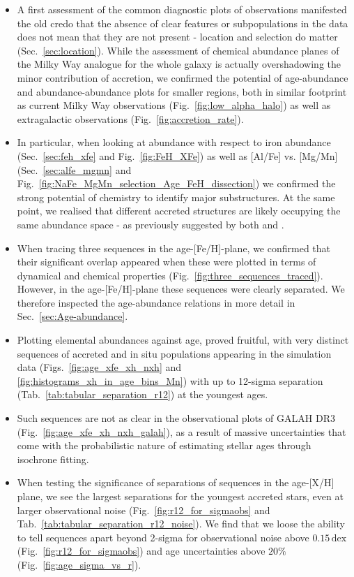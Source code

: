 \documentclass[fleqn,usenatbib]{mnras}
\begin{document}
\begin{itemize}
    \item A first assessment of the common diagnostic plots of observations manifested the old credo that the absence of clear features or subpopulations in the data does not mean that they are not present - location and selection do matter (Sec.~\ref{sec:location}). While the assessment of chemical abundance planes of the Milky Way analogue for the whole galaxy is actually overshadowing the minor contribution of accretion, we confirmed the potential of age-abundance and abundance-abundance plots for smaller regions, both in similar footprint as current Milky Way observations (Fig.~\ref{fig:low_alpha_halo}) as well as extragalactic observations (Fig.~\ref{fig:accretion_rate}).
    \item In particular, when looking at abundance with respect to iron abundance (Sec.~\ref{sec:feh_xfe} and Fig.~\ref{fig:FeH_XFe}) as well as [Al/Fe] vs. [Mg/Mn] (Sec.~\ref{sec:alfe_mgmn} and Fig.~\ref{fig:NaFe_MgMn_selection_Age_FeH_dissection}) we confirmed the strong potential of chemistry to identify major substructures. At the same point, we realised that different accreted structures are likely occupying the same abundance space - as previously suggested by both \citet{Horta2021} and \citet{Rey2023}.
    \item When tracing three sequences in the age-[Fe/H]-plane, we confirmed that their significant overlap appeared when these were plotted in terms of dynamical and chemical properties (Fig.~\ref{fig:three_sequences_traced}). However, in the age-[Fe/H]-plane these sequences were clearly separated. We therefore inspected the age-abundance relations in more detail in Sec.~\ref{sec:Age-abundance}. 
    \item Plotting elemental abundances against age, proved fruitful, with very distinct sequences of accreted and in situ populations appearing in the simulation data (Figs.~\ref{fig:age_xfe_xh_nxh} and \ref{fig:histograms_xh_in_age_bins_Mn}) with up to 12-sigma separation (Tab.~\ref{tab:tabular_separation_r12}) at the youngest ages.
    \item Such sequences are not as clear in the observational plots of GALAH DR3 (Fig.~\ref{fig:age_xfe_xh_nxh_galah}), as a result of massive uncertainties that come with the probabilistic nature of estimating stellar ages through isochrone fitting.
    \item When testing the significance of separations of sequences in the age-[X/H] plane, we see the largest separations for the youngest accreted stars, even at larger observational noise (Fig.~\ref{fig:r12_for_sigmaobs} and Tab.~\ref{tab:tabular_separation_r12_noise}). We find that we loose the ability to tell sequences apart beyond 2-sigma for observational noise above $0.15\,\mathrm{dex}$ (Fig.~\ref{fig:r12_for_sigmaobs}) and age uncertainties above $20\%$ (Fig.~\ref{fig:age_sigma_vs_r}).

\end{itemize}
\end{document}
